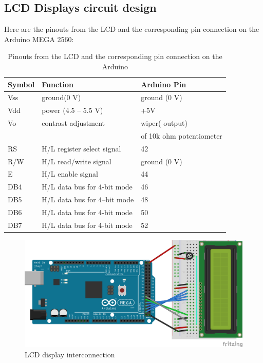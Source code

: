 \subsection{LCD Displays circuit design}
Here are the pinouts from the LCD and the corresponding pin connection on the Arduino MEGA 2560:
\begin{table}[H]
	\centering
	\caption{Pinouts from the LCD and the corresponding pin connection on the Arduino}	
	\label{tab:LCD_connectto_Arduino}
	\begin{tabularx}{0.65\textwidth}{lll}
		\toprule
		\textbf{Symbol} & \textbf{Function} & \textbf{Arduino Pin} 	\\
		\midrule
		Vss & ground(0 V) & ground (0 V) 							\\
		\midrule
		Vdd & power (4.5 – 5.5 V) & +5V 							\\
		\midrule
		Vo & contrast adjustment & wiper( output) 					\\
		& & of 10k ohm potentiometer 								\\
		\midrule
		RS & H/L register select signal & 42 						\\
		\midrule
		R/W	& H/L read/write signal & ground (0 V) 					\\
		\midrule
		E & H/L enable signal	& 44 								\\
		\midrule
		DB4	& H/L data bus for 4-bit mode & 46 						\\
		\midrule
		DB5	& H/L data bus for 4--bit mode & 48 					\\
		\midrule
		DB6	& H/L data bus for 4-bit mode & 50 						\\
		\midrule
		DB7	& H/L data bus for 4-bit mode & 52 						\\
		\bottomrule
	\end{tabularx}
\end{table}

\begin{figure}[H]
	\centering
	\includegraphics[width=\maxwidth{15cm}, keepaspectratio]{Chapters/Fig/deltarobot_LCD_16x2.png}
	\caption{LCD display interconnection}
	\label{fig:deltarobot_LCD_16x2}
\end{figure}

